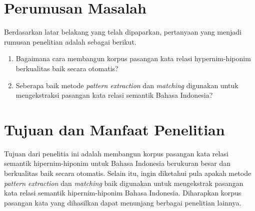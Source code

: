 
%
\section{Perumusan Masalah}
Berdasarkan latar belakang yang telah dipaparkan, pertanyaan yang menjadi rumusan penelitian adalah sebagai berikut.
\begin{enumerate}
	\item Bagaimana cara membangun korpus pasangan kata relasi hypernim-hiponim berkualitas baik secara otomatis?
	\item Seberapa baik metode \textit{pattern extraction} dan \textit{matching} digunakan untuk mengekstraksi pasangan kata relasi semantik Bahasa Indonesia?
\end{enumerate}

%
\section{Tujuan dan Manfaat Penelitian}
Tujuan dari penelitia ini adalah membangun korpus pasangan kata relasi semantik hipernim-hiponim untuk Bahasa Indonesia berukuran besar dan berkualitas baik secara otomatis. Selain itu, ingin diketahui pula apakah metode \textit{pattern extraction} dan \textit{matching} baik digunakan untuk mengekstrak pasangan kata relasi semantik hipernim-hiponim Bahasa Indonesia. Diharapkan korpus pasangan kata yang dihasilkan dapat menunjang berbagai penelitian lainnya.

